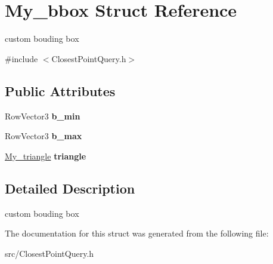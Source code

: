 \hypertarget{struct_my__bbox}{}\section{My\+\_\+bbox Struct Reference}
\label{struct_my__bbox}


custom bouding box  




{\ttfamily \#include $<$Closest\+Point\+Query.\+h$>$}

\subsection*{Public Attributes}
\begin{DoxyCompactItemize}
\item 
Row\+Vector3 {\bfseries b\+\_\+min}\hypertarget{struct_my__bbox_a477c05bf85862174e05f590d4bd86fe1}{}\label{struct_my__bbox_a477c05bf85862174e05f590d4bd86fe1}

\item 
Row\+Vector3 {\bfseries b\+\_\+max}\hypertarget{struct_my__bbox_a47c3895d56f3a39de2d5b71144f7df35}{}\label{struct_my__bbox_a47c3895d56f3a39de2d5b71144f7df35}

\item 
\hyperlink{struct_my__triangle}{My\+\_\+triangle} {\bfseries triangle}\hypertarget{struct_my__bbox_a5219bf5d6d8311707905d6d32aa767b6}{}\label{struct_my__bbox_a5219bf5d6d8311707905d6d32aa767b6}

\end{DoxyCompactItemize}


\subsection{Detailed Description}
custom bouding box 

The documentation for this struct was generated from the following file\+:\begin{DoxyCompactItemize}
\item 
src/Closest\+Point\+Query.\+h\end{DoxyCompactItemize}
